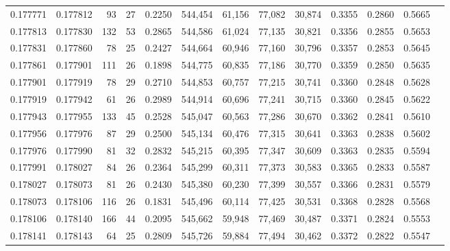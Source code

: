 \begin{tabular}{rrrrrrrrrrrrr}
0.177771 & 0.177812 &  93 &  27 &                                     0.2250 & 544,454 &  61,156 &  77,082 &  30,874 & 0.3355 & 0.2860 & 0.5665 \\
0.177813 & 0.177830 & 132 &  53 &                                     0.2865 & 544,586 &  61,024 &  77,135 &  30,821 & 0.3356 & 0.2855 & 0.5653 \\
0.177831 & 0.177860 &  78 &  25 &                                     0.2427 & 544,664 &  60,946 &  77,160 &  30,796 & 0.3357 & 0.2853 & 0.5645 \\
0.177861 & 0.177901 & 111 &  26 &                                     0.1898 & 544,775 &  60,835 &  77,186 &  30,770 & 0.3359 & 0.2850 & 0.5635 \\
0.177901 & 0.177919 &  78 &  29 &                                     0.2710 & 544,853 &  60,757 &  77,215 &  30,741 & 0.3360 & 0.2848 & 0.5628 \\
0.177919 & 0.177942 &  61 &  26 &                                     0.2989 & 544,914 &  60,696 &  77,241 &  30,715 & 0.3360 & 0.2845 & 0.5622 \\
0.177943 & 0.177955 & 133 &  45 &                                     0.2528 & 545,047 &  60,563 &  77,286 &  30,670 & 0.3362 & 0.2841 & 0.5610 \\
0.177956 & 0.177976 &  87 &  29 &                                     0.2500 & 545,134 &  60,476 &  77,315 &  30,641 & 0.3363 & 0.2838 & 0.5602 \\
0.177976 & 0.177990 &  81 &  32 &                                     0.2832 & 545,215 &  60,395 &  77,347 &  30,609 & 0.3363 & 0.2835 & 0.5594 \\
0.177991 & 0.178027 &  84 &  26 &                                     0.2364 & 545,299 &  60,311 &  77,373 &  30,583 & 0.3365 & 0.2833 & 0.5587 \\
0.178027 & 0.178073 &  81 &  26 &                                     0.2430 & 545,380 &  60,230 &  77,399 &  30,557 & 0.3366 & 0.2831 & 0.5579 \\
0.178073 & 0.178106 & 116 &  26 &                                     0.1831 & 545,496 &  60,114 &  77,425 &  30,531 & 0.3368 & 0.2828 & 0.5568 \\
0.178106 & 0.178140 & 166 &  44 &                                     0.2095 & 545,662 &  59,948 &  77,469 &  30,487 & 0.3371 & 0.2824 & 0.5553 \\
0.178141 & 0.178143 &  64 &  25 &                                     0.2809 & 545,726 &  59,884 &  77,494 &  30,462 & 0.3372 & 0.2822 & 0.5547 \\

\end{tabular}
